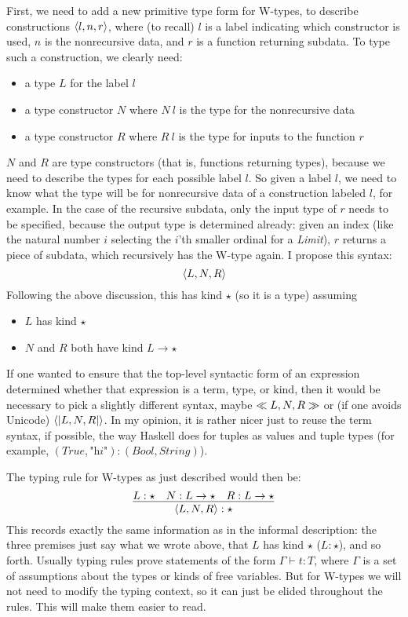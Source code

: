 \documentclass{article}
\begin{document}
First, we need to add a new primitive type form for W-types, to describe
constructions $\langle l , n, r \rangle$, where (to recall) $l$ is a label indicating
which constructor is used, $n$ is the nonrecursive data, and
$r$ is a function returning subdata.  To type such a construction, we
clearly need:
\begin{itemize}
\item a type $L$ for the label $l$
\item a type constructor $N$ where $N\ l$ is the type for the nonrecursive data
\item a type constructor $R$ where $R\ l$ is the type for inputs to the function $r$
\end{itemize}
\noindent $N$ and $R$ are type constructors (that is, functions returning types), because
we need to describe the types for each possible label $l$.  So given a label $l$, we need
to know what the type will be for nonrecursive data of a construction labeled $l$, for example.
In the case of the recursive subdata, only the input type of $r$ needs to be specified, because the output
type is determined already: given an index (like the natural number $i$ selecting the $i$'th smaller
ordinal for a \textit{Limit}), $r$ returns a piece of subdata, which recursively
has the W-type again.  I propose this syntax:
\[
\langle L , N , R \rangle
\]
\noindent Following the above discussion, this has kind $\star$ (so it is a type) assuming
\begin{itemize}
\item $L$ has kind $\star$
\item $N$ and $R$ both have kind $L \to \star$
\end{itemize}

\noindent If one wanted to ensure that the top-level syntactic form of an expression
determined whether that expression is a term, type, or kind, then it would be necessary
to pick a slightly different syntax, maybe $\ll L , N , R \gg$ or (if one avoids Unicode) $\langle| L , N , R |\rangle$.
In my opinion, it is rather nicer just to reuse the term syntax, if possible, the way
Haskell does for tuples as values and tuple types (for example, $(\textit{True},\textit{"hi"}) : (\textit{Bool},\textit{String})$).

The typing rule for W-types as just described would then be:
\[
\infer{ \w{L}{N}{R} : \star}{L : \star & N : L \to \star  & R : L \to \star }
\]
\noindent This records exactly the same information as in the informal
description: the three premises just say what we wrote above, that $L$
has kind $\star$ ($L : \star$), and so forth.  Usually typing rules
prove statements of the form $\Gamma \vdash t : T$, where $\Gamma$ is
a set of assumptions about the types or kinds of free variables.  But
for W-types we will not need to modify the typing context, so it can
just be elided throughout the rules.  This will make them easier to
read.
\end{document}
